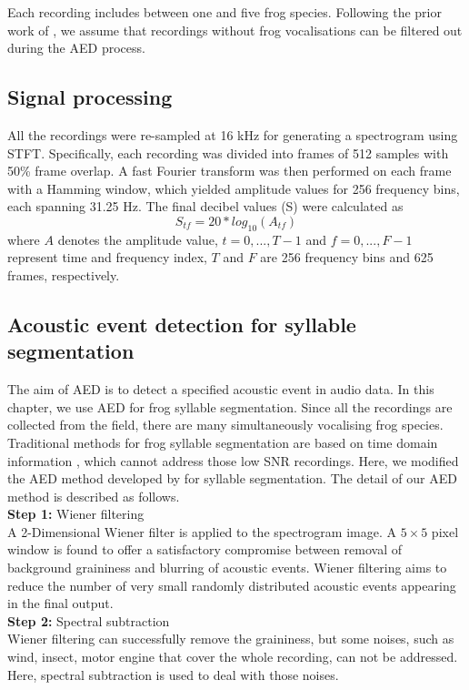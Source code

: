 Each recording includes between one and five frog species. Following the prior work of \citep{briggs2012acoustic}, we assume that recordings without frog vocalisations can be filtered out during the AED process.

\subsection{Signal processing}
All the recordings were re-sampled at 16 kHz for generating a spectrogram using STFT. Specifically, each recording was divided into frames of 512 samples with 50\% frame overlap.
A fast Fourier transform was then performed on each frame with a Hamming window, which yielded amplitude values for 256 frequency bins, each spanning 31.25 Hz. The final decibel values (S) were calculated as 
\begin{equation}
S_{tf} = 20*log_{10}(A_{tf})
\end{equation}
where $A$ denotes the amplitude value, $t=0,...,T-1$ and $f=0,...,F-1$ represent time and frequency index, $T$ and $F$ are 256 frequency bins and 625 frames, respectively. 

\subsection{Acoustic event detection for syllable segmentation}
\label{Ch5:AEDmethod}

The aim of AED is to detect a specified acoustic event in audio data. In this chapter, we use AED for frog syllable segmentation. Since all the recordings are collected from the field, there are many simultaneously vocalising frog species. Traditional methods for frog syllable segmentation are based on time domain information \citep{somervuo2004classification,huang2009frog}, which cannot address those low SNR recordings. Here, we modified the AED method developed by  \cite{towsey2012toolbox} for syllable segmentation. The detail of our AED method is described as follows.
\\
\textbf{Step 1:} Wiener filtering 
\noindent
\\
A 2-Dimensional Wiener filter is applied to the spectrogram image. A 
$5\times5$ pixel window is found to offer a satisfactory compromise between removal of background graininess and blurring of acoustic events. Wiener filtering aims to reduce the number of very small randomly distributed acoustic events appearing in the final output.
\\
\textbf{Step 2:} Spectral subtraction
\noindent 
\\
Wiener filtering can successfully remove the graininess, but some noises, such as wind, insect, motor engine that cover the whole recording, can not be addressed. Here, spectral subtraction is used to deal with those noises. 



